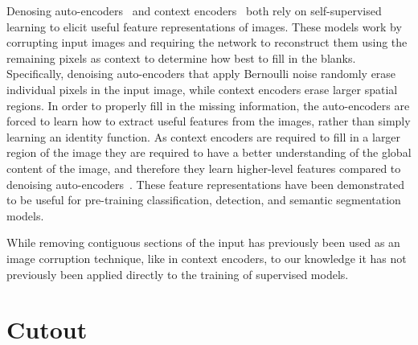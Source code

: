\documentclass[10pt,twocolumn,letterpaper]{article}
\begin{document}
Denosing auto-encoders~\cite{vincent2010stacked} and context encoders~\cite{pathak2016context} both rely on self-supervised learning to elicit useful feature representations of images. These models work by corrupting input images and requiring the network to reconstruct them using the remaining pixels as context to determine how best to fill in the blanks. Specifically, denoising auto-encoders that apply Bernoulli noise randomly erase individual pixels in the input image, while context encoders erase larger spatial regions. In order to properly fill in the missing information, the auto-encoders are forced to learn how to extract useful features from the images, rather than simply learning an identity function. As context encoders are required to fill in a larger region of the image they are required to have a better understanding of the global content of the image, and therefore they learn higher-level features compared to denoising auto-encoders~\cite{pathak2016context}. These feature representations have been demonstrated to be useful for pre-training classification, detection, and semantic segmentation models.

While removing contiguous sections of the input has previously been used as an image corruption technique, like in context encoders, to our knowledge it has not previously been applied directly to the training of supervised models.

\section{Cutout}





\end{document}
